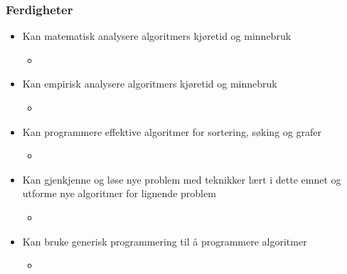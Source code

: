 \documentclass{article}
\begin{document}
    \subsubsection{Ferdigheter}
    \begin{itemize}
        \item Kan matematisk analysere algoritmers kjøretid og minnebruk
            \begin{itemize}
                \item \color{red}{Big \( O \)}
            \end{itemize}
        \item Kan empirisk analysere algoritmers kjøretid og minnebruk
            \begin{itemize}
                \item \color{red}{Kjøre programmet og ta tiden, doubling rate}
            \end{itemize}
        \item Kan programmere effektive algoritmer for sortering, søking og grafer
            \begin{itemize}
                \item \color{red}{Obligene og ukesoppgavene}
            \end{itemize}
        \item Kan gjenkjenne og løse nye problem med teknikker lært i dette emnet og utforme nye algoritmer for lignende problem
            \begin{itemize}
                \item \color{red}{Obligene}
            \end{itemize}
        \item Kan bruke generisk programmering til å programmere algoritmer
            \begin{itemize}
                \item \color{red}{Se på eksempler fra forelesningene og obligenee}
            \end{itemize}
    \end{itemize}
\end{document}
